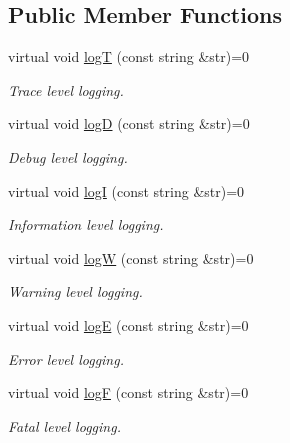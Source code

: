 \subsection*{Public Member Functions}
\begin{DoxyCompactItemize}
\item 
virtual void \hyperlink{classit_1_1testbench_1_1logger_1_1Logger_ac3806fa9e733644bd47fb4c5b70a81a2}{log\-T} (const string \&str)=0
\begin{DoxyCompactList}\small\item\em Trace level logging. \end{DoxyCompactList}\item 
virtual void \hyperlink{classit_1_1testbench_1_1logger_1_1Logger_ac0c11e80868df767e26304187fe290c5}{log\-D} (const string \&str)=0
\begin{DoxyCompactList}\small\item\em Debug level logging. \end{DoxyCompactList}\item 
virtual void \hyperlink{classit_1_1testbench_1_1logger_1_1Logger_a49505d8fd1fde54d6addc03164dbd256}{log\-I} (const string \&str)=0
\begin{DoxyCompactList}\small\item\em Information level logging. \end{DoxyCompactList}\item 
virtual void \hyperlink{classit_1_1testbench_1_1logger_1_1Logger_aa90a63a9ecbb042a37c1fdb86cd38f17}{log\-W} (const string \&str)=0
\begin{DoxyCompactList}\small\item\em Warning level logging. \end{DoxyCompactList}\item 
virtual void \hyperlink{classit_1_1testbench_1_1logger_1_1Logger_a73e44a27d36a54ec79afc615a39b86ca}{log\-E} (const string \&str)=0
\begin{DoxyCompactList}\small\item\em Error level logging. \end{DoxyCompactList}\item 
virtual void \hyperlink{classit_1_1testbench_1_1logger_1_1Logger_a5d3d2c2980de82ecec6941398ee620f1}{log\-F} (const string \&str)=0
\begin{DoxyCompactList}\small\item\em Fatal level logging. \end{DoxyCompactList}\end{DoxyCompactItemize}


